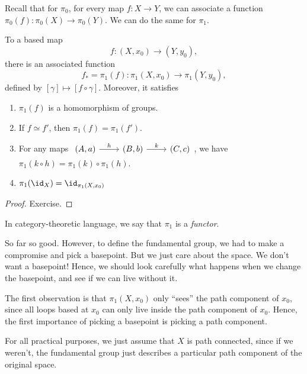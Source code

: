 \documentclass[a4paper]{article}
\begin{document}
Recall that for $\pi_0$, for every map $f: X\to Y$, we can associate a function $\pi_0(f): \pi_0(X) \to \pi_0(Y)$. We can do the same for $\pi_1$.
\begin{prop}
  To a based map
  \[
    f: (X, x_0) \to (Y, y_0),
  \]
  there is an associated function
  \[
    f_* = \pi_1(f): \pi_1(X, x_0) \to \pi_1(Y, y_0),
  \]
  defined by $[\gamma] \mapsto [f\circ \gamma]$. Moreover, it satisfies
  \begin{enumerate}
    \item $\pi_1(f)$ is a homomorphism of groups.
    \item If $f \simeq f'$, then $\pi_1(f) = \pi_1(f')$.
    \item For any maps $\begin{tikzcd} (A, a) \ar[r, "h"] & (B, b) \ar[r, "k"] & (C, c) \end{tikzcd}$, we have $\pi_1(k\circ h) = \pi_1(k)\circ \pi_1 (h)$.
    \item $\pi_1(\id_X) = \id_{\pi_1(X, x_0)}$
  \end{enumerate}
\end{prop}

\begin{proof}
  Exercise.
\end{proof}
In category-theoretic language, we say that $\pi_1$ is a \emph{functor}.

So far so good. However, to define the fundamental group, we had to make a compromise and pick a basepoint. But we just care about the space. We don't want a basepoint! Hence, we should look carefully what happens when we change the basepoint, and see if we can live without it.

The first observation is that $\pi_1(X, x_0)$ only ``sees'' the path component of $x_0$, since all loops based at $x_0$ can only live inside the path component of $x_0$. Hence, the first importance of picking a basepoint is picking a path component.

For all practical purposes, we just assume that $X$ is path connected, since if we weren't, the fundamental group just describes a particular path component of the original space.
\end{document}
